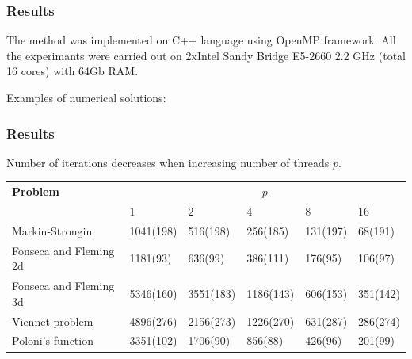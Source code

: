 \documentclass[aspectratio=1610]{beamer}
\begin{document}
\begin{frame}
  \frametitle{Results}
  The method was implemented on C++ language using OpenMP framework. All the experimants were carried out on
  2xIntel Sandy Bridge E5-2660 2.2 GHz (total 16 cores) with 64Gb RAM.

  Examples of numerical solutions:
  \begin{figure}[ht]
      \centering
  \end{figure}
\end{frame}

\begin{frame}
  \frametitle{Results}

  Number of iterations decreases when increasing number of threads \(p\).
  \begin{table}
    \centering
    \begin{tabular}{|l|p{1.5cm}|p{1.5cm}|p{1.5cm}|p{1.5cm}|p{1.5cm}|}
  \hline
  \textbf{Problem} & \multicolumn{5}{c|}{\(p\)}\\
  \cline{2-6}
    & \(1\) & \(2\) & \(4\) & \(8\) & \(16\)\\
  \hline
  Markin-Strongin & 1041(198) & 516(198) & 256(185) & 131(197) & 68(191) \\
  \hline
  Fonseca and Fleming 2d & 1181(93) & 636(99) & 386(111) & 176(95) & 106(97) \\
  \hline
  Fonseca and Fleming 3d & 5346(160) & 3551(183) & 1186(143) & 606(153) & 351(142) \\
  \hline
  Viennet problem & 4896(276) & 2156(273) & 1226(270) & 631(287) & 286(274)\\
  \hline
  Poloni's function & 3351(102) & 1706(90) & 856(88) & 426(96) & 201(99) \\
  \hline
  \end{tabular}
  \end{table}

\end{frame}
\end{document}
